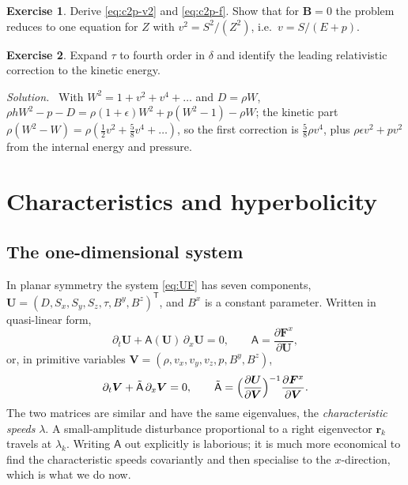 \documentclass[11pt,a4paper,oneside,openany]{book}
\theoremstyle{definition}
\newtheorem{exercise}{Exercise}[chapter]
\theoremstyle{plain}
\theoremstyle{remark}
\newenvironment{solution}{\par\smallskip\noindent\small\textit{Solution.}\ }{\par\medskip}
\newcommand{\BB}{\bm{B}}
\newcommand{\UU}{\bm{U}}
\newcommand{\FF}{\bm{F}}
\newcommand{\VV}{\bm{V}}
\begin{document}
\begin{exercise}
Derive \eqref{eq:c2p-v2} and \eqref{eq:c2p-f}. Show that for $\BB=0$ the problem
reduces to one equation for $Z$ with $v^2=S^2/(Z^2)$, i.e.\ $v=S/(E+p)$.
\end{exercise}

\begin{exercise}
Expand $\tau$ to fourth order in $\delta$ and identify the leading relativistic
correction to the kinetic energy.
\end{exercise}
\begin{solution}
With $W^2=1+v^2+v^4+\dots$ and $D=\rho W$, $\rho hW^2-p-D=\rho(1+\epsilon)W^2+p(W^2-1)-\rho W$;
the kinetic part $\rho(W^2-W)=\rho(\frac12v^2+\frac58v^4+\dots)$, so the first
correction is $\frac58\rho v^4$, plus $\rho\epsilon v^2+pv^2$ from the internal energy
and pressure.
\end{solution}

\chapter{Characteristics and hyperbolicity}\label{ch:characteristics}

\section{The one-dimensional system}

In planar symmetry the system \eqref{eq:UF} has seven components,
$\UU=(D,S_x,S_y,S_z,\tau,B^y,B^z)^{\mathsf T}$, and $B^x$ is a constant parameter. Written
in quasi-linear form,
\begin{equation}
\partial_t\UU+\mathsf{A}(\UU)\,\partial_x\UU=0,\qquad \mathsf{A}=\frac{\partial\FF^x}{\partial\UU},
\end{equation}
or, in primitive variables $\VV=(\rho,v_x,v_y,v_z,p,B^y,B^z)$,
\begin{equation}
\partial_t\VV+\tilde{\mathsf A}\,\partial_x\VV=0,\qquad
\tilde{\mathsf A}=\Bigl(\frac{\partial\UU}{\partial\VV}\Bigr)^{-1}\frac{\partial\FF^x}{\partial\VV}.
\end{equation}
The two matrices are similar and have the same eigenvalues, the \emph{characteristic speeds}
$\lambda$. A small-amplitude disturbance proportional to a right eigenvector $\bm r_k$
travels at $\lambda_k$. Writing $\mathsf A$ out explicitly is laborious; it is much more
economical to find the characteristic speeds covariantly and then specialise to the
$x$-direction, which is what we do now.
\end{document}
